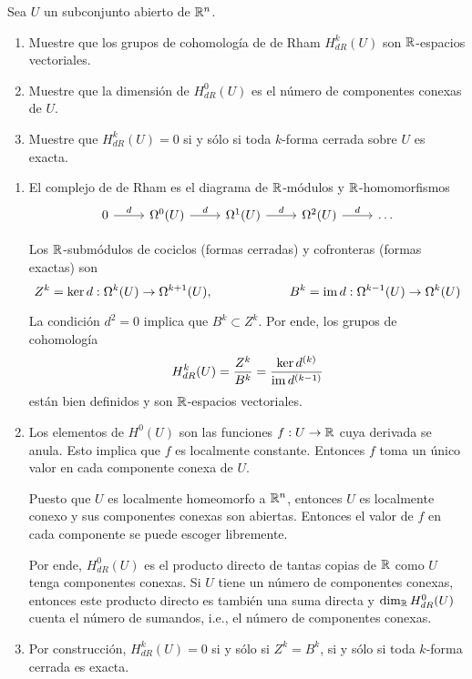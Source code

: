 \begin{exercise}
Sea $U$ un subconjunto abierto de $\mathbb R^n$.

\begin{enumerate}[label=\alph*)]
    \item Muestre que los grupos de cohomología de de Rham $H_{dR}^k(U)$ son $\mathbb R$-espacios vectoriales.
    \item Muestre que la dimensión de $H_{dR}^0(U)$ es el número de componentes conexas de $U$.
    \item Muestre que $H_{dR}^k(U) = 0$ si y sólo si toda $k$-forma cerrada sobre $U$ es exacta.
\end{enumerate}
\end{exercise}

\begin{solution}
\leavevmode
\begin{enumerate}[label=\alph*)]
    \item El complejo de de Rham es el diagrama de $\mathbb R$-módulos y $\mathbb R$-homomorfismos
    $$
    \begin{tikzcd}
    0
        \arrow[r, "d"] & \Omega^0(U)
        \arrow[r, "d"] & \Omega^1(U)
        \arrow[r, "d"] & \Omega^2(U)
        \arrow[r, "d"] & \dots
    \end{tikzcd}
    $$
    
    Los $\mathbb R$-submódulos de cociclos (formas cerradas) y cofronteras (formas exactas) son
    $$
    Z^k = \ker d : \Omega^k(U) \to \Omega^{k+1}(U), \qquad \qquad \qquad
    B^k = \operatorname{im} d : \Omega^{k-1}(U) \to \Omega^k(U)
    $$
    
    La condición $d^2 = 0$ implica que $B^k \subset Z^k$. Por ende, los grupos de cohomología
    $$H_{dR}^k(U) = \frac {Z^k} {B^k} = \frac {\ker d^{(k)}} {\operatorname{im} d^{(k-1)}}$$
    están bien definidos y son $\mathbb R$-espacios vectoriales.
    
    \item Los elementos de $H^0(U)$ son las funciones $f : U \to \mathbb R$ cuya derivada se anula. Esto implica que $f$ es localmente constante. Entonces $f$ toma un único valor en cada componente conexa de $U$.
    
    Puesto que $U$ es localmente homeomorfo a $\mathbb R^n$, entonces $U$ es localmente conexo y sus componentes conexas son abiertas. Entonces el valor de $f$ en cada componente se puede escoger libremente.
    
    Por ende, $H_{dR}^0(U)$ es el producto directo de tantas copias de $\mathbb R$ como $U$ tenga componentes conexas. Si $U$ tiene un número de componentes conexas, entonces este producto directo es también una suma directa y $\dim_\mathbb R H_{dR}^0(U)$ cuenta el número de sumandos, i.e., el número de componentes conexas.
    
    \item Por construcción, $H_{dR}^k(U) = 0$ si y sólo si $Z^k = B^k$, si y sólo si toda $k$-forma cerrada es exacta.
\end{enumerate}
\end{solution}
